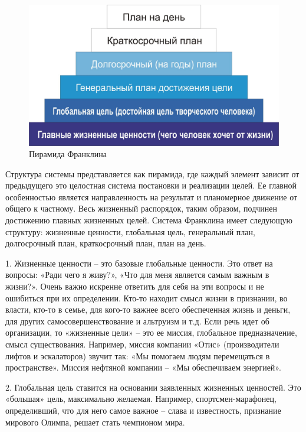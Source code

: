 \label{page:domain:piramida_franklina}
\begin{figure}
\centering
  \includegraphics[scale=0.85]{images/franklin_piramida.jpg}
  \caption{ Пирамида Франклина }
  \label{fig:domain:franklin}
\end{figure}


Структура системы представляется как пирамида, где каждый элемент зависит от предыдущего это целостная система постановки и реализации целей. Ее главной особенностью является направленность на результат и планомерное движение от общего к частному. Весь жизненный распорядок, таким образом, подчинен достижению главных жизненных целей. Система Франклина имеет следующую структуру: жизненные ценности, глобальная цель, генеральный план, долгосрочный план, краткосрочный план, план на день. 


1. Жизненные ценности – это базовые глобальные ценности. Это ответ на вопросы: «Ради чего я живу?», «Что для меня является самым важным в жизни?». Очень важно искренне ответить для себя на эти вопросы и не ошибиться при их определении. Кто-то находит смысл жизни в признании, во власти, кто-то в семье, для кого-то важнее всего обеспеченная жизнь и деньги, для других самосовершенствование и альтруизм и т.д. Если речь идет об организации, то «жизненные цели» – это ее миссия, глобальное предназначение, смысл существования. Например, миссия компании «Отис» (производители лифтов и эскалаторов) звучит так: «Мы помогаем людям перемещаться в пространстве». Миссия нефтяной компании – «Мы обеспечиваем энергией». 

2. Глобальная цель ставится на основании заявленных жизненных ценностей. Это «большая» цель, максимально желаемая. Например, спортсмен-марафонец, определивший, что для него самое важное – слава и известность, признание мирового Олимпа, решает стать чемпионом мира. 

